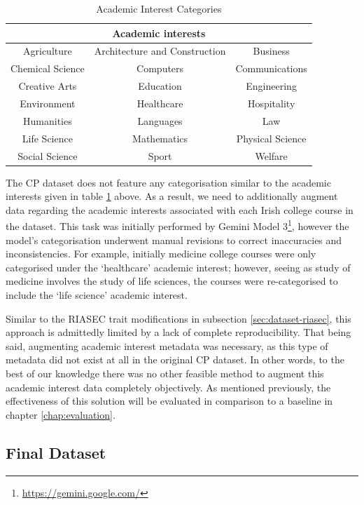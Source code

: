 \begin{table}[H]
\centering
\caption{Academic Interest Categories}
\begin{tabular}{|c|c|c|}
\hline
\multicolumn{3}{|c|}{\textbf{Academic interests}}\\
\hline
Agriculture & Architecture and Construction & Business \\
\hline
Chemical Science & Computers & Communications\\
\hline
Creative Arts & Education & Engineering\\
\hline
Environment & Healthcare & Hospitality\\
\hline
Humanities & Languages & Law\\
\hline
Life Science & Mathematics & Physical Science\\
\hline
Social Science & Sport & Welfare\\
\hline
\end{tabular}
\label{tab:academic-interest-categories}
\end{table}

The CP dataset does not feature any categorisation similar to the academic interests given in table \ref{tab:academic-interest-categories} above.
As a result, we need to additionally augment data regarding the academic interests associated with each Irish college course in the dataset.
This task was initially performed by Gemini Model 3\footnote{\url{https://gemini.google.com/}},
however the model's categorisation underwent manual revisions to correct inaccuracies and inconsistencies.
For example, initially medicine college courses were only categorised under the `healthcare' academic interest;
however, seeing as study of medicine involves the study of life sciences, 
the courses were re-categorised to include the `life science' academic interest.

Similar to the RIASEC trait modifications in subsection \ref{sec:dataset-riasec}, 
this approach is admittedly limited by a lack of complete reproducibility.
That being said, augmenting academic interest metadata was necessary,
as this type of metadata did not exist at all in the original CP dataset.
In other words, to the best of our knowledge there was no other feasible method to augment 
this academic interest data completely objectively.
As mentioned previously, the effectiveness of this solution 
will be evaluated in comparison to a baseline in chapter \ref{chap:evaluation}.

\subsection{Final Dataset}

